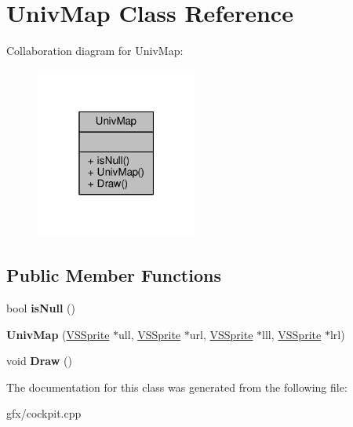 \hypertarget{classUnivMap}{}\section{Univ\+Map Class Reference}
\label{classUnivMap}


Collaboration diagram for Univ\+Map\+:
\nopagebreak
\begin{figure}[H]
\begin{center}
\leavevmode
\includegraphics[width=151pt]{d1/d01/classUnivMap__coll__graph}
\end{center}
\end{figure}
\subsection*{Public Member Functions}
\begin{DoxyCompactItemize}
\item 
bool {\bfseries is\+Null} ()\hypertarget{classUnivMap_a815b29d93d75744d9ad3ce20c9a6b26e}{}\label{classUnivMap_a815b29d93d75744d9ad3ce20c9a6b26e}

\item 
{\bfseries Univ\+Map} (\hyperlink{classVSSprite}{V\+S\+Sprite} $\ast$ull, \hyperlink{classVSSprite}{V\+S\+Sprite} $\ast$url, \hyperlink{classVSSprite}{V\+S\+Sprite} $\ast$lll, \hyperlink{classVSSprite}{V\+S\+Sprite} $\ast$lrl)\hypertarget{classUnivMap_a9b98b713fdaed68ab1ccfcdc7a7a238b}{}\label{classUnivMap_a9b98b713fdaed68ab1ccfcdc7a7a238b}

\item 
void {\bfseries Draw} ()\hypertarget{classUnivMap_ab9709fb2bcf7d7158eff14f8de72ad8a}{}\label{classUnivMap_ab9709fb2bcf7d7158eff14f8de72ad8a}

\end{DoxyCompactItemize}


The documentation for this class was generated from the following file\+:\begin{DoxyCompactItemize}
\item 
gfx/cockpit.\+cpp\end{DoxyCompactItemize}
